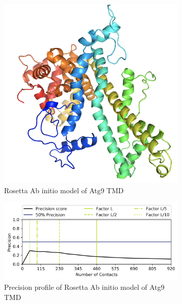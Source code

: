 \begin{figure}[htb]
    \centering %
\begin{subfigure}{0.25\textwidth}
  \includegraphics[width=\linewidth]{Modelling of Atg9/atg_ros_ab.png}
  \caption{Rosetta Ab initio model of Atg9 TMD}
  \label{fig:0}
\end{subfigure}\hfil %
\begin{subfigure}{0.25\textwidth}
  \includegraphics[width=\linewidth]{Modelling of Atg9/prec_ros.png}
  \caption{Precision profile of Rosetta Ab initio model of Atg9 TMD}
  \label{fig:0}
\end{subfigure}\hfil %
\begin{subfigure}{0.25\textwidth}

\end{subfigure}
\end{figure}
